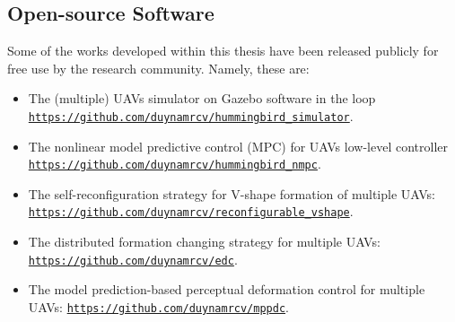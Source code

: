 \subsection{Open-source Software}\label{sec23}
Some of the works developed within this thesis have been released publicly for free use by the research community. Namely, these are:
\begin{itemize}
    \item The (multiple) UAVs simulator on Gazebo software in the loop {\tt\url{https://github.com/duynamrcv/hummingbird_simulator}}.
        \item The nonlinear model predictive control (MPC) for UAVs low-level controller {\tt\url{https://github.com/duynamrcv/hummingbird_nmpc}}.
    \item The self-reconfiguration strategy for V-shape formation of multiple UAVs: {\tt\url{https://github.com/duynamrcv/reconfigurable_vshape}}.
        \item The distributed formation changing strategy for multiple UAVs: {\tt\url{https://github.com/duynamrcv/edc}}.
    \item The model prediction-based perceptual deformation control for multiple UAVs: {\tt\url{https://github.com/duynamrcv/mppdc}}.
\end{itemize}

